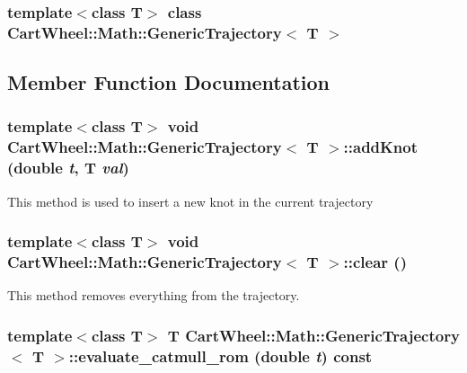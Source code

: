 \subsubsection*{template$<$class T$>$ class CartWheel::Math::GenericTrajectory$<$ T $>$}



\subsection{Member Function Documentation}
\hypertarget{classCartWheel_1_1Math_1_1GenericTrajectory_a167576a75cce038f3749533d9c5ed1ec}{
\subsubsection[{addKnot}]{\setlength{\rightskip}{0pt plus 5cm}template$<$class T$>$ void {\bf CartWheel::Math::GenericTrajectory}$<$ T $>$::addKnot (double {\em t}, \/  T {\em val})}}
\label{classCartWheel_1_1Math_1_1GenericTrajectory_a167576a75cce038f3749533d9c5ed1ec}
This method is used to insert a new knot in the current trajectory \hypertarget{classCartWheel_1_1Math_1_1GenericTrajectory_a45a40950e42d857c58a4d144ab7f01e9}{
\subsubsection[{clear}]{\setlength{\rightskip}{0pt plus 5cm}template$<$class T$>$ void {\bf CartWheel::Math::GenericTrajectory}$<$ T $>$::clear ()}}
\label{classCartWheel_1_1Math_1_1GenericTrajectory_a45a40950e42d857c58a4d144ab7f01e9}
This method removes everything from the trajectory. \hypertarget{classCartWheel_1_1Math_1_1GenericTrajectory_a1ea20f4abe766ee96d5f4bf77dd2a837}{
\subsubsection[{evaluate\_\-catmull\_\-rom}]{\setlength{\rightskip}{0pt plus 5cm}template$<$class T$>$ T {\bf CartWheel::Math::GenericTrajectory}$<$ T $>$::evaluate\_\-catmull\_\-rom (double {\em t}) const}}

